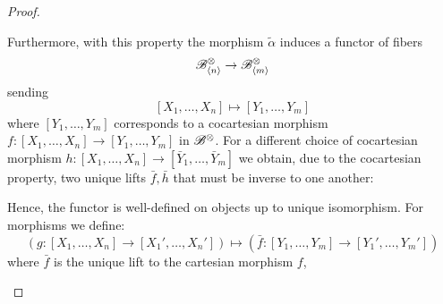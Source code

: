 \begin{proof}
\begin{enumerate}
        Furthermore, with this property the morphism $\widetilde{\alpha}$
        induces a functor of fibers
        \[
            \mathscr{B}^{\otimes}_{\langle n \rangle} \to \mathscr{B}^{\otimes}_{\langle m \rangle}
        \]
        sending
        \[
            [X_1, \dots, X_n] \mapsto [Y_1, \dots, Y_m]
        \]
        where $[Y_1, \dots, Y_m]$ corresponds to a cocartesian morphism $f
        \colon [X_1, \dots, X_n] \to [Y_1, \dots, Y_m]$ in $\mathscr{B}^{\otimes}$. For a
        different choice of cocartesian morphism $h \colon [X_1, \dots, X_n] \to
        [\bar{Y}_1, \dots, \bar{Y}_m]$ we obtain, due to the cocartesian
        property, two unique lifts $\bar{f}, \bar{h}$ that must be inverse to
        one another:
        \begin{center}
        \end{center}
        Hence, the functor is well-defined on objects up to unique isomorphism.
        For morphisms we define:
        \[
            (g \colon [X_1, \dots, X_n] \to [X_1', \dots, X_n'])  \mapsto (\bar{f} \colon [Y_1, \dots, Y_m] \to [Y_1', \dots, Y_m'])
        \]
        where $\bar{f}$ is the unique lift to the cartesian morphism $f$,

\end{enumerate}
\end{proof}
